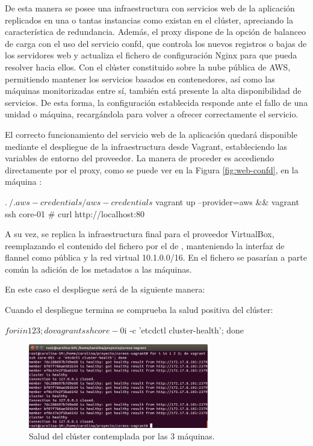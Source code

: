 De esta manera se posee una infraestructura con servicios web de la aplicación replicados en una o tantas instancias como existan en el clúster, apreciando la característica de redundancia. Además, el proxy dispone de la opción de balanceo de carga con el uso del servicio confd, que controla los nuevos registros o bajas de los servidores web y actualiza el fichero de configuración Nginx para que pueda resolver hacia ellos. Con el clúster constituido sobre la nube pública de AWS, permitiendo mantener los servicios basados en contenedores, así como las máquinas monitorizadas entre sí, también está presente la alta disponibilidad de servicios. De esta forma, la configuración establecida responde ante el fallo de una unidad o máquina, recargándola para volver a ofrecer correctamente el servicio.

El correcto funcionamiento del servicio web de la aplicación quedará disponible mediante el despliegue de la infraestructura desde Vagrant, estableciendo las variables de entorno del proveedor. La manera de proceder es accediendo directamente por el proxy, como se puede ver en la Figura \ref{fig:web-confd}, en la máquina :

\begin{code}
$ . ~/.aws-credentials/aws-credentials
$ vagrant up --provider=aws && vagrant ssh core-01
# curl http://localhost:80
\end{code}

A su vez, se replica la infraestructura final para el proveedor VirtualBox, reemplazando el contenido del fichero  por el de , manteniendo la interfaz de flannel como pública y la red virtual 10.1.0.0/16. En el fichero  se pasarían a parte común la adición de los metadatos a las máquinas.

En este caso el despliegue será de la siguiente manera:


Cuando el despliegue termina se comprueba la salud positiva del clúster:

\begin{code}
$ for i in 1 2 3; do vagrant ssh core-0$i -c 'etcdctl cluster-health'; done
\end{code}

\begin{figure}[H]
\centering
\includegraphics[width=0.7\textwidth]{images/figures/health-vbox.png}
\caption{Salud del clúster contemplada por las 3 máquinas.}
\end{figure}

